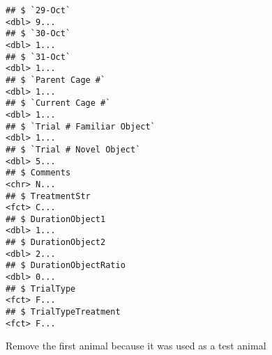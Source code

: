 \documentclass[]{article}
\newenvironment{Shaded}{\begin{snugshade}}{\end{snugshade}}
\newcommand{\KeywordTok}[1]{\textcolor[rgb]{0.13,0.29,0.53}{\textbf{#1}}}
\newcommand{\DecValTok}[1]{\textcolor[rgb]{0.00,0.00,0.81}{#1}}
\newcommand{\StringTok}[1]{\textcolor[rgb]{0.31,0.60,0.02}{#1}}
\newcommand{\CommentTok}[1]{\textcolor[rgb]{0.56,0.35,0.01}{\textit{#1}}}
\newcommand{\OperatorTok}[1]{\textcolor[rgb]{0.81,0.36,0.00}{\textbf{#1}}}
\newcommand{\NormalTok}[1]{#1}
\begin{document}
\begin{verbatim}
## $ `29-Oct`                                                     <dbl> 9...
## $ `30-Oct`                                                     <dbl> 1...
## $ `31-Oct`                                                     <dbl> 1...
## $ `Parent Cage #`                                              <dbl> 1...
## $ `Current Cage #`                                             <dbl> 1...
## $ `Trial # Familiar Object`                                    <dbl> 1...
## $ `Trial # Novel Object`                                       <dbl> 5...
## $ Comments                                                     <chr> N...
## $ TreatmentStr                                                 <fct> C...
## $ DurationObject1                                              <dbl> 1...
## $ DurationObject2                                              <dbl> 2...
## $ DurationObjectRatio                                          <dbl> 0...
## $ TrialType                                                    <fct> F...
## $ TrialTypeTreatment                                           <fct> F...
\end{verbatim}

Remove the first animal because it was used as a test animal

\begin{Shaded}
\end{Shaded}
\end{document}
